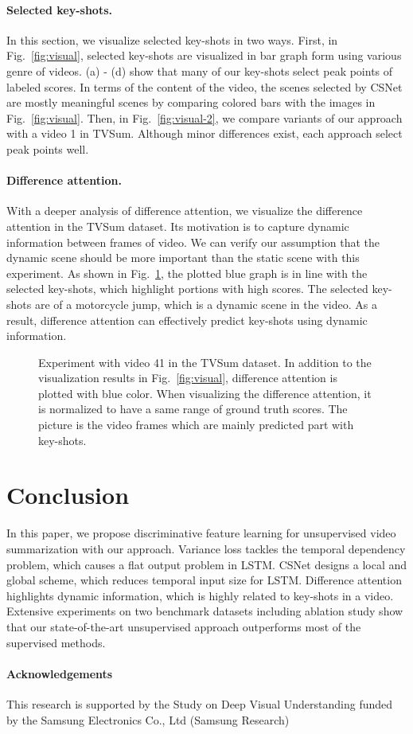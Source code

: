 \documentclass[letterpaper]{article} \usepackage{aaai19}  \usepackage{times}  \usepackage{helvet}  \usepackage{courier}  \usepackage{url}  \usepackage{graphicx}  \frenchspacing  \setlength{\pdfpagewidth}{8.5in}  \setlength{\pdfpageheight}{11in}
\newcommand{\figref}[1]{Fig.~\ref{#1}}
\begin{document}
\paragraph{Selected key-shots.}
In this section, we visualize selected key-shots in two ways.
First, in \figref{fig:visual}, selected key-shots are visualized in bar graph form using various genre of videos. (a) - (d) show that many of our key-shots select peak points of labeled scores. In terms of the content of the video, the scenes selected by CSNet are mostly meaningful scenes by comparing colored bars with the images in \figref{fig:visual}. Then, in \figref{fig:visual-2}, we compare variants of our approach with a video 1 in TVSum. Although minor differences exist, each approach select peak points well.



\paragraph{Difference attention.}
With a deeper analysis of difference attention, we visualize the difference attention in the TVSum dataset. Its motivation is to capture dynamic information between frames of video. We can verify our assumption that the dynamic scene should be more important than the static scene with this experiment. As shown in \figref{fig:diff}, the plotted blue graph is in line with the selected key-shots, which highlight portions with high scores. The selected key-shots are of a motorcycle jump, which is a dynamic scene in the video. As a result, difference attention can effectively predict key-shots using dynamic information.

\begin{figure}[t]
\centering{}
\caption{ Experiment with video 41 in the TVSum dataset. In addition to the visualization results in \figref{fig:visual}, difference attention is plotted with blue color. When visualizing the difference attention, it is normalized to have a same range of ground truth scores. The picture is the video frames which are mainly predicted part with key-shots.}
\label{fig:diff}
\end{figure}

\section{Conclusion}
In this paper, we propose discriminative feature learning for unsupervised video summarization with our approach. Variance loss tackles the temporal dependency problem, which causes a flat output problem in LSTM. CSNet designs a local and global scheme, which reduces temporal input size for LSTM. Difference attention highlights dynamic information, which is highly related to key-shots in a video. Extensive experiments on two benchmark datasets including ablation study show that our state-of-the-art unsupervised approach outperforms most of the supervised methods.

\paragraph{Acknowledgements}
This research is supported by the Study on Deep Visual Understanding funded by the Samsung Electronics Co., Ltd (Samsung Research)
\medskip





{
	 
	
}
\end{document}
